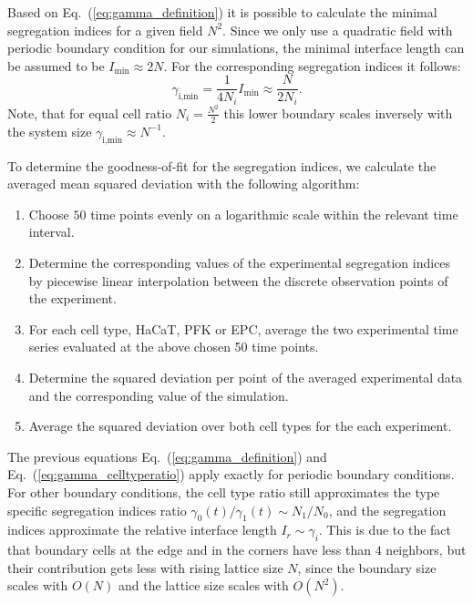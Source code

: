 \documentclass[10pt,letterpaper]{article}
\renewcommand{\eqref}[1]{Eq.~(\ref{eq:#1})}
\begin{document}
Based on \eqref{gamma_definition} it is possible to calculate
the minimal segregation indices for a given field $N^2$. Since we only use a
quadratic field with periodic boundary condition for our simulations, the
minimal interface length can be assumed to be $I_\text{min} \approx 2N$.
For the corresponding segregation indices it follows:
%
\begin{equation}
  \label{eq:min_gamma}
  \gamma_\text{i,min}=\frac{1}{4N_i}I_\text{min}\approx\frac{N}{2N_i}\text{.}
\end{equation}
%
Note, that for equal cell ratio $N_i = \frac{N^2}{2}$ this lower boundary
scales inversely with the system size $\gamma_\text{i,min} \approx N^{-1}$.

To determine the goodness-of-fit for the segregation indices, we calculate the
averaged mean squared deviation with the following algorithm:

\begin{enumerate}
  \item Choose $50$ time points evenly on a logarithmic scale within the
  relevant time interval.
  \item Determine the corresponding values of the experimental segregation
  indices by piecewise linear interpolation between the discrete observation
  points of the experiment.
  \item For each cell type, HaCaT, PFK or EPC, average the two experimental time
  series evaluated at the above chosen 50 time points.
  \item Determine the squared deviation per point of the averaged experimental
  data and the corresponding value of the simulation.
  \item Average the squared deviation over both cell types for the each
  experiment.
\end{enumerate}

The previous equations \eqref{gamma_definition} and
\eqref{gamma_celltyperatio} apply exactly for periodic boundary conditions.
For other boundary conditions, the cell type ratio still
approximates the type specific segregation indices ratio
$\gamma_0(t)/\gamma_1(t)\sim N_1/N_0$, and the segregation indices
approximate the relative interface length $I_r \sim \gamma_i$. This is
due to the fact that boundary cells at the edge and in the corners have less
than $4$ neighbors, but their contribution gets less with rising
lattice size $N$, since the boundary size scales with $O(N)$ and the
lattice size scales with $ O(N^2)$.
\end{document}
